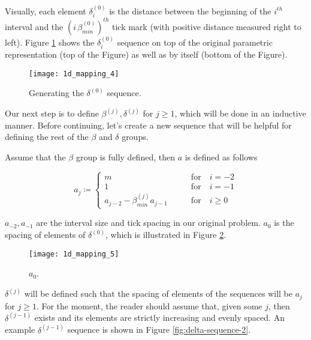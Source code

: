 Visually, each element $\delta^{(0)}_i$ is the distance between the beginning of the $i^{th}$ interval and the $(i \, \beta^{(0)}_{min})^{th}$ tick mark (with positive distance measured right to left). Figure \ref{fig:delta-sequence} shows the $\delta^{(0)}_i$ sequence on top of the original parametric representation (top of the Figure) as well as by itself (bottom of the Figure).

\begin{figure}[H]
  \begin{center}
    \texttt{[image: 1d\_mapping\_4]}
  \end{center}
  \vspace{-.2in} %
  \caption{\label{fig:delta-sequence} Generating the $\delta^{(0)}$ sequence.}
\end{figure}

Our next step is to define $\beta^{(j)}, \delta^{(j)}$ for $j \ge 1$, which will be done in an inductive manner. Before continuing, let's create a new sequence that will be helpful for defining the rest of the $\beta$ and $\delta$ groups.

\begin{definition}
  Assume that the $\beta$ group is fully defined, then $a$ is defined as follows

  \begin{equation}
    a_j \coloneqq \begin{cases}
      m \qquad &\text{for} \quad i = -2\\
      1 \qquad &\text{for} \quad i = -1\\
      a_{j-2} - \beta^{(j)}_{min} a_{j-1} \qquad &\text{for} \quad i \ge 0
    \end{cases}
  \end{equation}
\end{definition}

$a_{-2}, a_{-1}$ are the interval size and tick spacing in our original problem. $a_0$ is the spacing of elements of $\delta^{(0)}$, which is illustrated in Figure \ref{fig:a-0}.

\begin{figure}[H]
  \begin{center}
    \texttt{[image: 1d\_mapping\_5]}
  \end{center}
  \vspace{-.2in} %
  \caption{\label{fig:a-0} $a_0$.}
\end{figure}

$\delta^{(j)}$ will be defined such that the spacing of elements of the sequences will be $a_j$ for $j \ge 1$. For the moment, the reader should assume that, given some $j$, then $\delta^{(j-1)}$ exists and its elements are strictly increasing and evenly spaced. An example $\delta^{(j-1)}$ sequence is shown in Figure \ref{fig:delta-sequence-2}.

